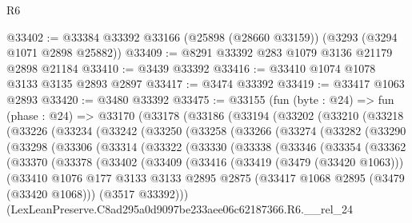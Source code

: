 \begin{lexlean}{R6}
\begin{coremodule}
@33402 := @33384 @33392 @33166 (@25898 (@28660 @33159)) (@3293 (@3294 @1071 @2898 @25882))
@33409 := @8291 @33392 @283 @1079 @3136 @21179 @2898 @21184
@33410 := @3439 @33392
@33416 := @33410 @1074 @1078 @3133 @3135 @2893 @2897
@33417 := @3474 @33392
@33419 := @33417 @1063 @2893
@33420 := @3480 @33392
@33475 := @33155
    (fun (byte : @24) =>
    fun (phase : @24) =>
    @33170
      (@33178
        (@33186
          (@33194
            (@33202
              (@33210
                (@33218
                  (@33226
                    (@33234
                      (@33242
                        (@33250
                          (@33258
                            (@33266
                              (@33274
                                (@33282
                                  (@33290
                                    (@33298
                                      (@33306
                                        (@33314
                                          (@33322
                                            (@33330
                                              (@33338
                                                (@33346
                                                  (@33354
                                                    (@33362
                                                      (@33370
                                                        (@33378
                                                          (@33402
                                                            (@33409
                                                              (@33416
                                                                (@33419 (@3479 (@33420 @1063)))
                                                                (@33410
                                                                  @1076
                                                                  @177
                                                                  @3133
                                                                  @3133
                                                                  @2895
                                                                  @2875
                                                                  (@33417
                                                                    @1068
                                                                    @2895
                                                                    (@3479 (@33420 @1068)))
                                                                  (@3517 @33392)))
                                                              (LexLeanPreserve.C8ad295a0d9097be233aee06c62187366.R6.__rel_24

\end{coremodule}
\end{lexlean}
